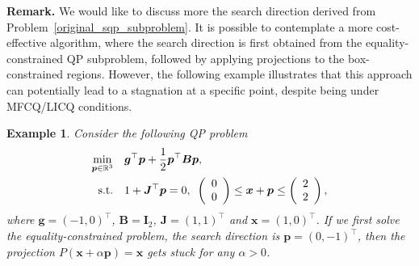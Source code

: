 \documentclass[aos]{imsart}
\numberwithin{equation}{section}
\theoremstyle{plain}
\newtheorem{example}{Example}
\begin{document}
\textbf{Remark.} We would like to discuss more the search direction derived from Problem~\eqref{original_sqp_subproblem}.
It is possible to contemplate a more cost-effective algorithm, where the search direction is first obtained from the equality-constrained QP subproblem, followed by applying projections to the box-constrained regions. However, the following example illustrates that this approach can potentially lead to a stagnation at a specific point, despite being under MFCQ/LICQ conditions. 
\begin{example}
    Consider the following QP problem
    \begin{equation*}
        \begin{split}
            \min_{\bm{p} \in \mathbb{R}^{3}} & \hspace{1em} \bm{g}^{\top} \bm{p} + \frac{1}{2} \bm{p}^{\top} \bm{B} \bm{p},\\
            \text{s.t.} & \hspace{1em} 1 + \bm{J}^{\top} \bm{p} = 0, \hspace{0.5em}  \left(\begin{array}{c}
             0  \\
             0
        \end{array} \right) \leq \bm{x} + \bm{p} \leq  \left(\begin{array}{c}
             2  \\
             2
        \end{array} \right),
        \end{split}
    \end{equation*}
    where $\bm{g} = (-1,0)^{\top}$, $\bm{B} = \bm{I}_2$, $\bm{J} = (1,1)^{\top}$ and $\bm{x} = (1, 0)^{\top}$. If we first solve the equality-constrained problem, the search direction is $\bm{p} = (0,-1)^{\top}$, then the projection $P(\bm{x}+\alpha \bm{p}) = \bm{x}$ gets stuck for any $\alpha > 0$.
\end{example}
\end{document}
